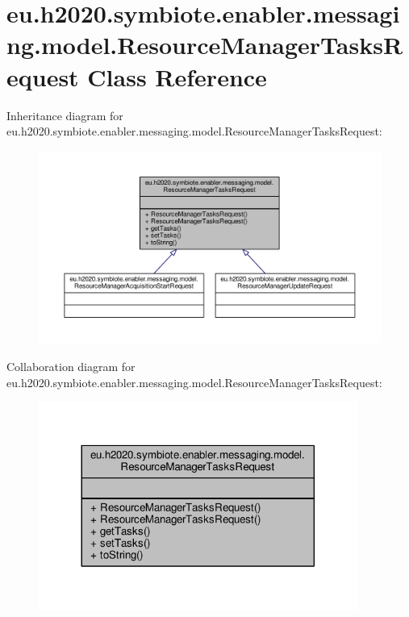 \hypertarget{classeu_1_1h2020_1_1symbiote_1_1enabler_1_1messaging_1_1model_1_1ResourceManagerTasksRequest}{}\section{eu.\+h2020.\+symbiote.\+enabler.\+messaging.\+model.\+Resource\+Manager\+Tasks\+Request Class Reference}
\label{classeu_1_1h2020_1_1symbiote_1_1enabler_1_1messaging_1_1model_1_1ResourceManagerTasksRequest}


Inheritance diagram for eu.\+h2020.\+symbiote.\+enabler.\+messaging.\+model.\+Resource\+Manager\+Tasks\+Request\+:\nopagebreak
\begin{figure}[H]
\begin{center}
\leavevmode
\includegraphics[width=350pt]{classeu_1_1h2020_1_1symbiote_1_1enabler_1_1messaging_1_1model_1_1ResourceManagerTasksRequest__inherit__graph}
\end{center}
\end{figure}


Collaboration diagram for eu.\+h2020.\+symbiote.\+enabler.\+messaging.\+model.\+Resource\+Manager\+Tasks\+Request\+:\nopagebreak
\begin{figure}[H]
\begin{center}
\leavevmode
\includegraphics[width=296pt]{classeu_1_1h2020_1_1symbiote_1_1enabler_1_1messaging_1_1model_1_1ResourceManagerTasksRequest__coll__graph}
\end{center}
\end{figure}

